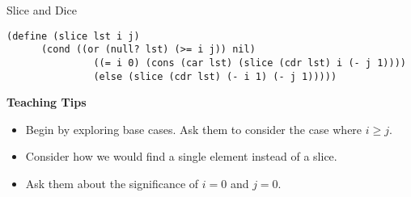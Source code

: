 \question Slice and Dice

\begin{parts}
\begin{blocksection}

\begin{solution}
\begin{lstlisting}
(define (slice lst i j)
      (cond ((or (null? lst) (>= i j)) nil)
               ((= i 0) (cons (car lst) (slice (cdr lst) i (- j 1))))
               (else (slice (cdr lst) (- i 1) (- j 1)))))
\end{lstlisting}
\end{solution}

\end{blocksection}

\begin{blocksection}
\begin{guide}
\textbf{Teaching Tips}
\begin{itemize}
	\item Begin by exploring base cases. Ask them to consider the case where $i \geq j$.
	\item Consider how we would find a single element instead of a slice.
	\item Ask them about the significance of $i=0$ and $j=0$.
\end{itemize}
\end{guide}
\end{blocksection}



\end{parts}

